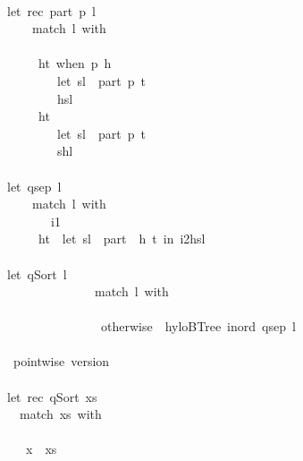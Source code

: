 \documentclass[a4paper]{article}
\begin{document}
\begin{tabbing}
\ttfamily ~\\
\ttfamily ~let~rec~part~p~l~\\
\ttfamily ~~~~~match~l~with\\
\ttfamily ~~~~~~~~\\
\ttfamily ~~~~~~ht~when~p~h~\\
\ttfamily ~~~~~~~~~let~sl~~part~p~t\\
\ttfamily ~~~~~~~~~hsl\\
\ttfamily ~~~~~~ht~\\
\ttfamily ~~~~~~~~~let~sl~~part~p~t\\
\ttfamily ~~~~~~~~~shl\\
\ttfamily ~~~~\\
\ttfamily ~let~qsep~l~\\
\ttfamily ~~~~~match~l~with\\
\ttfamily ~~~~~~~~i1\\
\ttfamily ~~~~~~ht~~let~sl~~part~~h~t~in~i2hsl\\
\ttfamily ~~~~~\\
\ttfamily ~let~qSort~l~\\
\ttfamily ~~~~~~~~~~~~~~~match~l~with\\
\ttfamily ~~~~~~~~~~~~~~~~~~\\
\ttfamily ~~~~~~~~~~~~~~~~otherwise~~hyloBTree~inord~qsep~l\\
\ttfamily ~\\
\ttfamily ~~pointwise~version\\
\ttfamily ~\\
\ttfamily ~let~rec~qSort~xs~\\
\ttfamily ~~~match~xs~with\\
\ttfamily ~~~~~~\\
\ttfamily ~~~~x~~xs~\\

\end{tabbing}
\end{document}
